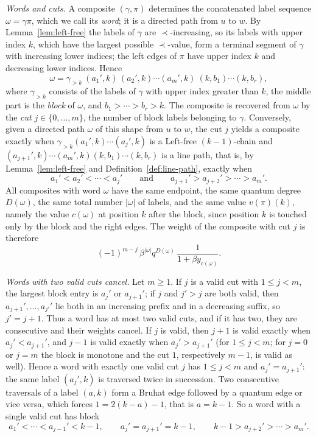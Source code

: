 \documentclass[11pt]{article}
\begin{document}
\emph{Words and cuts.}
A composite $(\gamma,\pi)$ determines the concatenated label sequence
$\omega=\gamma\pi$, which we call its \emph{word}; it is a directed
path from $u$ to $w$. By Lemma~\ref{lem:left-free} the labels of
$\gamma$ are $\prec$-increasing, so its labels with upper index $k$,
which have the largest possible $\prec$-value, form a terminal
segment of $\gamma$ with increasing lower indices; the left edges of
$\pi$ have upper index $k$ and decreasing lower indices. Hence
\[
 \omega=\gamma_{>k}\ (a_1',k)\,(a_2',k)\cdots(a_m',k)\ (k,b_1)\cdots(k,b_r),
\]
where $\gamma_{>k}$ consists of the labels of $\gamma$ with upper
index greater than $k$, the middle part is the \emph{block} of
$\omega$, and $b_1>\cdots>b_r>k$. The composite is recovered from
$\omega$ by the \emph{cut} $j\in\{0,\ldots,m\}$, the number of block
labels belonging to $\gamma$. Conversely, given a directed path
$\omega$ of this shape from $u$ to $w$, the cut $j$ yields a composite
exactly when $\gamma_{>k}(a_1',k)\cdots(a_j',k)$ is a Left-free
$(k-1)$-chain and $(a_{j+1}',k)\cdots(a_m',k)(k,b_1)\cdots(k,b_r)$ is
a line path, that is, by Lemma~\ref{lem:left-free} and
Definition~\ref{def:line-path}, exactly when
\[
 a_1'<a_2'<\cdots<a_j'
 \qquad\text{and}\qquad
 a_{j+1}'>a_{j+2}'>\cdots>a_m' .
\]
All composites with word $\omega$ have the same endpoint, the same
quantum degree $D(\omega)$, the same total number $|\omega|$ of
labels, and the same value $v(\pi)(k)$, namely the value $c(\omega)$
at position $k$ after the block, since position $k$ is touched only
by the block and the right edges. The weight of the composite with cut
$j$ is therefore
\[
 (-1)^{m-j}\,\beta^{|\omega|}q^{D(\omega)}\,\frac1{1+\beta y_{c(\omega)}} .
\]

\emph{Words with two valid cuts cancel.}
Let $m\geq1$. If $j$ is a valid cut with $1\leq j<m$, the largest
block entry is $a_j'$ or $a_{j+1}'$; if $j$ and $j'>j$ are both valid,
then $a_{j+1}',\ldots,a_{j'}'$ lie both in an increasing prefix and in
a decreasing suffix, so $j'=j+1$. Thus a word has at most two valid
cuts, and if it has two, they are consecutive and their weights
cancel. If $j$ is valid, then $j+1$ is valid exactly when
$a_j'<a_{j+1}'$, and $j-1$ is valid exactly when $a_j'>a_{j+1}'$
(for $1\leq j<m$; for $j=0$ or $j=m$ the block is monotone and the
cut $1$, respectively $m-1$, is valid as well). Hence a word with
exactly one valid cut $j$ has $1\leq j<m$ and $a_j'=a_{j+1}'$: the
same label $(a_j',k)$ is traversed twice in succession. Two
consecutive traversals of a label $(a,k)$ form a Bruhat edge followed
by a quantum edge or vice versa, which forces
$1=2(k-a)-1$, that is $a=k-1$. So a word with a single valid cut has
block
\begin{equation}\label{eq:single-cut-block}
 a_1'<\cdots<a_{j-1}'<k-1,\qquad a_j'=a_{j+1}'=k-1,\qquad
 k-1>a_{j+2}'>\cdots>a_m' .
\end{equation}
\end{document}
